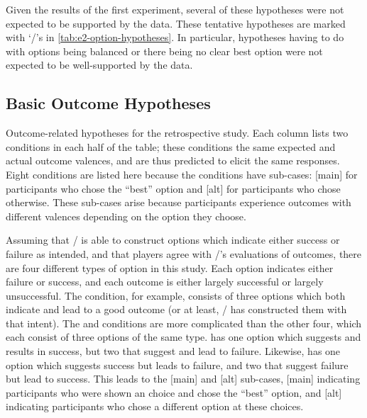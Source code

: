 Given the results of the first experiment, several of these hypotheses were not expected to be supported by the data.
%
These tentative hypotheses are marked with `\lc/'s in \cref{tab:e2-option-hypotheses}.
%
In particular, hypotheses having to do with options being balanced or there being no clear best option were not expected to be well-supported by the data.


\subsection{Basic Outcome Hypotheses}

\begin{table}[!p]
\centering
\bgroup
\def\arraystretch{1.3}
\setlength{\tabcolsep}{0.6em}

\egroup
\caption[Retrospective outcome hypotheses]{Outcome-related hypotheses for the retrospective study. Each column lists two conditions in each half of the table; these conditions the same expected and actual outcome valences, and are thus predicted to elicit the same responses. Eight conditions are listed here because the  conditions have sub-cases: [main] for participants who chose the ``best'' option and [alt] for participants who chose otherwise. These sub-cases arise because participants experience outcomes with different valences depending on the option they choose.}
  \label{tab:e2-outcome-hypotheses}
\end{table}

Assuming that \dunyazad/ is able to construct options which indicate either success or failure as intended, and that players agree with \dunyazad/'s evaluations of outcomes, there are four different types of option in this study.
%
Each option indicates either failure or success, and each outcome is either largely successful or largely unsuccessful.
%
The \exps{} condition, for example, consists of three options which both indicate and lead to a good outcome (or at least, \dunyazad/ has constructed them with that intent).
%
The \obvs{} and \obvf{} conditions are more complicated than the other four, which each consist of three options of the same type.
%
\obvs{} has one option which suggests and results in success, but two that suggest and lead to failure.
%
Likewise, \obvf{} has one option which suggests success but leads to failure, and two that suggest failure but lead to success.
%
This leads to the [main] and [alt] sub-cases, [main] indicating participants who were shown an  choice and chose the ``best'' option, and [alt] indicating participants who chose a different option at these choices.


